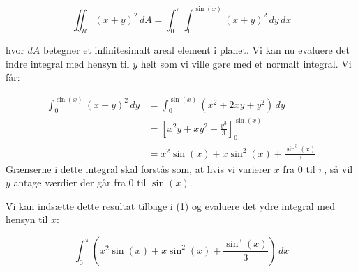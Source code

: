 \documentclass{article}
\begin{document}
\begin{figure}[H]
    \centering
\end{figure}
\begin{equation*}
    \iint_R (x+y)^2\,dA
    =
    \int_0^{\pi}\int_0^{\sin(x)} (x+y)^2\,dy\,dx
\end{equation*}

hvor $dA$ betegner et infinitesimalt areal element i planet. Vi kan nu evaluere det indre integral med hensyn til $y$ helt som vi ville gøre med et normalt integral. Vi får:

\begin{equation*}
    \begin{aligned}
    \int_0^{\sin(x)} (x+y)^2\,dy
    &= \int_0^{\sin(x)} (x^2+2xy+y^2)\,dy \\
    &= \left[x^2y+xy^2+\frac{y^3}{3}\right]_0^{\sin(x)} \\
    &= x^2\sin(x)+x\sin^2(x)+\frac{\sin^3(x)}{3}
    \end{aligned}
\end{equation*}
Grænserne i dette integral skal forstås som, at hvis vi varierer $x$ fra 0 til $\pi$, så vil $y$ antage værdier der går fra 0 til $\sin(x)$.

Vi kan indsætte dette resultat tilbage i (1) og evaluere det ydre integral med hensyn til $x$:

\begin{equation*}
    \int_0^{\pi}
    \left(
    x^2\sin(x)
    +x\sin^2(x)
    +\frac{\sin^3(x)}{3}
    \right)\,dx
\end{equation*}
\end{document}
